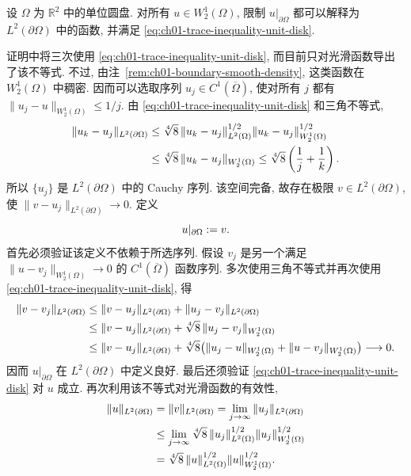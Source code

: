 \setcounter{thmcount}{2}
\begin{Proposition}
\label{prop:ch01-unit-disk-trace}
设 $\Omega$ 为 $\mathbb R^2$ 中的单位圆盘. 对所有 $u\in W_2^1(\Omega)$, 限制 $u|_{\partial\Omega}$ 都可以解释为 $L^2(\partial\Omega)$ 中的函数, 并满足 \eqref{eq:ch01-trace-inequality-unit-disk}.
\end{Proposition}

\begin{Proof}
证明中将三次使用 \eqref{eq:ch01-trace-inequality-unit-disk}, 而目前只对光滑函数导出了该不等式. 不过, 由注~\ref{rem:ch01-boundary-smooth-density}, 这类函数在 $W_2^1(\Omega)$ 中稠密. 因而可以选取序列 $u_j\in C^1(\overline\Omega)$, 使对所有 $j$ 都有 $\|u_j-u\|_{W_2^1(\Omega)}\leq1/j$. 由 \eqref{eq:ch01-trace-inequality-unit-disk} 和三角不等式,
\[
\MathBookFormulaID{formula-ch01-trace-cauchy-bound}
\begin{aligned}
\|u_k-u_j\|_{L^2(\partial\Omega)}
&\leq\sqrt[4]{8}\,
\|u_k-u_j\|_{L^2(\Omega)}^{1/2}
\|u_k-u_j\|_{W_2^1(\Omega)}^{1/2}\\
&\leq\sqrt[4]{8}\,\|u_k-u_j\|_{W_2^1(\Omega)}
\leq\sqrt[4]{8}\left(\frac1j+\frac1k\right).
\end{aligned}
\]
所以 $\{u_j\}$ 是 $L^2(\partial\Omega)$ 中的 Cauchy 序列. 该空间完备, 故存在极限 $v\in L^2(\partial\Omega)$, 使 $\|v-u_j\|_{L^2(\partial\Omega)}\to0$. 定义
\[
\MathBookFormulaID{formula-ch01-trace-definition-by-density}
u|_{\partial\Omega}:=v.
\]
首先必须验证该定义不依赖于所选序列. 假设 $v_j$ 是另一个满足 $\|u-v_j\|_{W_2^1(\Omega)}\to0$ 的 $C^1(\overline\Omega)$ 函数序列. 多次使用三角不等式并再次使用 \eqref{eq:ch01-trace-inequality-unit-disk}, 得
\[
\MathBookFormulaID{formula-ch01-trace-sequence-independence}
\begin{aligned}
\|v-v_j\|_{L^2(\partial\Omega)}
&\leq\|v-u_j\|_{L^2(\partial\Omega)}
+\|u_j-v_j\|_{L^2(\partial\Omega)}\\
&\leq\|v-u_j\|_{L^2(\partial\Omega)}
+\sqrt[4]{8}\,\|u_j-v_j\|_{W_2^1(\Omega)}\\
&\leq\|v-u_j\|_{L^2(\partial\Omega)}
+\sqrt[4]{8}\bigl(\|u_j-u\|_{W_2^1(\Omega)}
+\|u-v_j\|_{W_2^1(\Omega)}\bigr)\longrightarrow0.
\end{aligned}
\]
因而 $u|_{\partial\Omega}$ 在 $L^2(\partial\Omega)$ 中定义良好. 最后还须验证 \eqref{eq:ch01-trace-inequality-unit-disk} 对 $u$ 成立. 再次利用该不等式对光滑函数的有效性,
\[
\MathBookFormulaID{formula-ch01-trace-limit-bound}
\begin{aligned}
\|u\|_{L^2(\partial\Omega)}
&=\|v\|_{L^2(\partial\Omega)}
=\lim_{j\to\infty}\|u_j\|_{L^2(\partial\Omega)}\\
&\leq\lim_{j\to\infty}\sqrt[4]{8}\,
\|u_j\|_{L^2(\Omega)}^{1/2}\|u_j\|_{W_2^1(\Omega)}^{1/2}\\
&=\sqrt[4]{8}\,\|u\|_{L^2(\Omega)}^{1/2}
\|u\|_{W_2^1(\Omega)}^{1/2}.
\end{aligned}
\]
\end{Proof}

